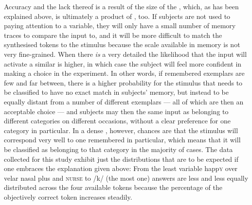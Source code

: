 Accuracy and the lack thereof is a result of the size of the , which, as has been explained above, is ultimately a product of , too.
If subjects are not used to paying attention to a variable, they will only have a small number of memory traces to compare the input to, and it will be more difficult to match the synthesised tokens to the stimulus because the scale available in memory is not very fine-grained.
When there \emph{is} a very detailed  the likelihood that the input will activate a similar  is higher, in which case the subject will feel more confident in making a choice in the experiment.
In other words, if remembered exemplars are few and far between, there is a higher probability for the stimulus that needs to be classified to have no exact match in subjects' memory, but instead to be equally distant from a number of different exemplars --- all of which are then an acceptable choice --- and subjects may then  the same input as belonging to different categories on different occasions, without a clear preference for one category in particular.
In a dense , however, chances are that the stimulus will correspond very well to one remembered  in particular, which means that it will be classified as belonging to that category in the majority of cases.
The data collected for this study exhibit just the distributions that are to be expected if one embraces the explanation given above: From the least  variable happ\textsc{y} over velar nasal plus and \textsc{nurse} to /k/  (the most  one) answers are less and less equally distributed across the four available tokens because the percentage of the objectively correct token increases steadily.

